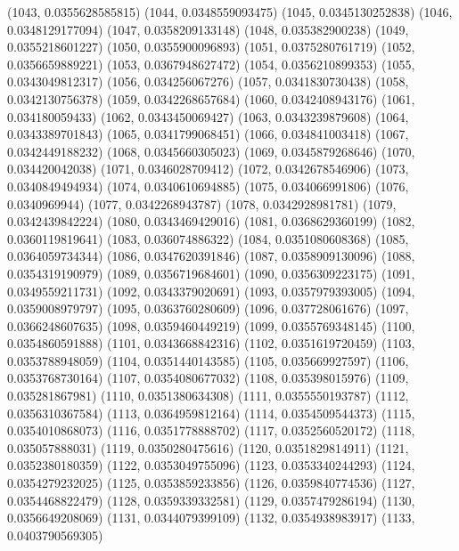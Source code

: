 {					(1043, 0.0355628585815)
					(1044, 0.0348559093475)
					(1045, 0.0345130252838)
					(1046, 0.0348129177094)
					(1047, 0.0358209133148)
					(1048, 0.035382900238)
					(1049, 0.0355218601227)
					(1050, 0.0355900096893)
					(1051, 0.0375280761719)
					(1052, 0.0356659889221)
					(1053, 0.0367948627472)
					(1054, 0.0356210899353)
					(1055, 0.0343049812317)
					(1056, 0.034256067276)
					(1057, 0.0341830730438)
					(1058, 0.0342130756378)
					(1059, 0.0342268657684)
					(1060, 0.0342408943176)
					(1061, 0.034180059433)
					(1062, 0.0343450069427)
					(1063, 0.0343239879608)
					(1064, 0.0343389701843)
					(1065, 0.0341799068451)
					(1066, 0.034841003418)
					(1067, 0.0342449188232)
					(1068, 0.0345660305023)
					(1069, 0.0345879268646)
					(1070, 0.034420042038)
					(1071, 0.0346028709412)
					(1072, 0.0342678546906)
					(1073, 0.0340849494934)
					(1074, 0.0340610694885)
					(1075, 0.034066991806)
					(1076, 0.0340969944)
					(1077, 0.0342268943787)
					(1078, 0.0342928981781)
					(1079, 0.0342439842224)
					(1080, 0.0343469429016)
					(1081, 0.0368629360199)
					(1082, 0.0360119819641)
					(1083, 0.036074886322)
					(1084, 0.0351080608368)
					(1085, 0.0364059734344)
					(1086, 0.0347620391846)
					(1087, 0.0358909130096)
					(1088, 0.0354319190979)
					(1089, 0.0356719684601)
					(1090, 0.0356309223175)
					(1091, 0.0349559211731)
					(1092, 0.0343379020691)
					(1093, 0.0357979393005)
					(1094, 0.0359008979797)
					(1095, 0.0363760280609)
					(1096, 0.037728061676)
					(1097, 0.0366248607635)
					(1098, 0.0359460449219)
					(1099, 0.0355769348145)
					(1100, 0.0354860591888)
					(1101, 0.0343668842316)
					(1102, 0.0351619720459)
					(1103, 0.0353788948059)
					(1104, 0.0351440143585)
					(1105, 0.035669927597)
					(1106, 0.0353768730164)
					(1107, 0.0354080677032)
					(1108, 0.035398015976)
					(1109, 0.035281867981)
					(1110, 0.0351380634308)
					(1111, 0.0355550193787)
					(1112, 0.0356310367584)
					(1113, 0.0364959812164)
					(1114, 0.0354509544373)
					(1115, 0.0354010868073)
					(1116, 0.0351778888702)
					(1117, 0.0352560520172)
					(1118, 0.035057888031)
					(1119, 0.0350280475616)
					(1120, 0.0351829814911)
					(1121, 0.0352380180359)
					(1122, 0.0353049755096)
					(1123, 0.0353340244293)
					(1124, 0.0354279232025)
					(1125, 0.0353859233856)
					(1126, 0.0359840774536)
					(1127, 0.0354468822479)
					(1128, 0.0359339332581)
					(1129, 0.0357479286194)
					(1130, 0.0356649208069)
					(1131, 0.0344079399109)
					(1132, 0.0354938983917)
					(1133, 0.0403790569305)
}
